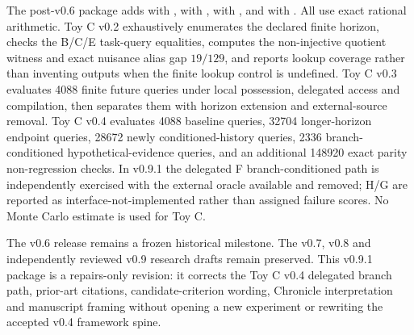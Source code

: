 \documentclass[10pt]{article}
\begin{document}
The post-v0.6 package adds  with ,  with ,  with , and  with . All use exact rational arithmetic. Toy C v0.2 exhaustively enumerates the declared finite horizon, checks the B/C/E task-query equalities, computes the non-injective quotient witness and exact nuisance alias gap $19/129$, and reports lookup coverage rather than inventing outputs when the finite lookup control is undefined. Toy C v0.3 evaluates 4088 finite future queries under local possession, delegated access and compilation, then separates them with horizon extension and external-source removal. Toy C v0.4 evaluates 4088 baseline queries, 32704 longer-horizon endpoint queries, 28672 newly conditioned-history queries, 2336 branch-conditioned hypothetical-evidence queries, and an additional 148920 exact parity non-regression checks. In v0.9.1 the delegated F branch-conditioned path is independently exercised with the external oracle available and removed; H/G are reported as interface-not-implemented rather than assigned failure scores. No Monte Carlo estimate is used for Toy C.

The v0.6 release remains a frozen historical milestone. The v0.7, v0.8 and independently reviewed v0.9 research drafts remain preserved. This v0.9.1 package is a repairs-only revision: it corrects the Toy C v0.4 delegated branch path, prior-art citations, candidate-criterion wording, Chronicle interpretation and manuscript framing without opening a new experiment or rewriting the accepted v0.4 framework spine.
\end{document}
